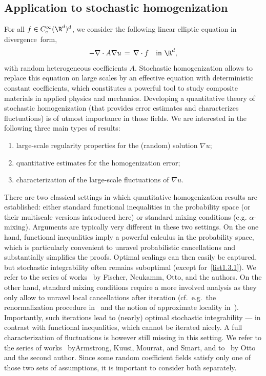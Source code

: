 \subsection{Application to stochastic homogenization}\label{sec:homog}

For all $f\in C^\infty_c(\R^d)^d$, we consider the following linear elliptic equation in divergence~form,
\begin{equation}\label{0-int-2}
-\nabla \cdot A\nabla u \,=\,\nabla\cdot f\quad \text{in }\R^d,
\end{equation}
with random heterogeneous coefficients $A$. Stochastic homogenization allows to replace this equation on large scales by an effective equation with deterministic constant coefficients, which constitutes a powerful tool to study composite materials in applied physics and mechanics. Developing a quantitative theory of stochastic homogenization (that provides error estimates and characterizes fluctuations) is of utmost importance in those fields. We are interested in the following three main types of results:
\begin{enumerate}\Romanenumi
\item \label{list1.3.1}large-scale regularity properties for the (random) solution $\nabla u$;
\item \label{list1.3.2}quantitative estimates for the homogenization error;
\item \label{list1.3.3}characterization of the large-scale fluctuations of $\nabla u$.
\end{enumerate}


There are two classical settings in which quantitative homogenization results are established: either standard functional inequalities in the probability space (or their multiscale versions introduced here) or standard mixing conditions (e.g. $\alpha$-mixing). Arguments are typically very different in these two settings. On the one hand, functional inequalities imply a powerful calculus in the probability space, which is particularly convenient to unravel probabilistic cancellations and substantially simplifies the proofs. Optimal scalings can then easily be captured, but stochastic integrability often remains suboptimal (except for~\eqref{list1.3.1}). We refer to the series of works~\cite{DGO1,DGO2,Fischer-Otto-16,GNO-quant,GNO-reg} by Fischer, Neukamm, Otto, and the authors. On the other hand, standard mixing conditions require a more involved analysis as they only allow to unravel local cancellations after iteration (cf.~e.g.~the renormalization procedure in~\cite{AKM1} and the notion of approximate locality in~\cite{GO4}). Importantly, such iterations lead to (nearly) optimal stochastic integrability --- in contrast with functional inequalities, which cannot be iterated nicely. A full characterization of fluctuations is however still missing in this setting. We refer to the series of works~\cite{AKM1,AKM2,AKM-book,Armstrong-Mourrat-16,Armstrong-Smart-16} by\linebreak Armstrong, Kuusi, Mourrat, and Smart, and to~\cite{GO4} by Otto and the second author. Since some random coefficient fields satisfy only one of those two sets of assumptions, it is important to consider both separately.

